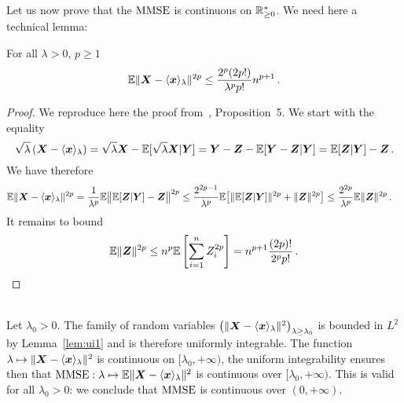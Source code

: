 \documentclass[12pt,nocut]{article}
\begin{document}
	Let us now prove that the ${{\rm MMSE}}$ is continuous on $\mathbb{R}_{\geq 0}^*$. We need here a technical lemma:
	\begin{lemma}\label{lem:ui1}
		For all $\lambda > 0$, $p \geq 1$
		$$
		\mathbb{E} \| {\boldsymbol X} - \langle {\boldsymbol x} \rangle_{\lambda} \|^{2p} \leq \frac{2^p (2p !)}{\lambda ^{p} p!} n^{p+1} \,.
		$$
	\end{lemma}
	\begin{proof}
		We reproduce here the proof from~\cite{guo2011estimation}, Proposition~5. We start with the equality
		$$
		\sqrt{\lambda} \left({\boldsymbol X} - \langle {\boldsymbol x} \rangle_{\lambda}\right)
		=
		\sqrt{\lambda} {\boldsymbol X} - \mathbb{E} [ \sqrt{\lambda} {\boldsymbol X} | {\boldsymbol Y} ]
		=
		{\boldsymbol Y} - {\boldsymbol Z} - \mathbb{E} [ {\boldsymbol Y} - {\boldsymbol Z} | {\boldsymbol Y} ]
		=
		\mathbb{E} [ {\boldsymbol Z} | {\boldsymbol Y} ] -{\boldsymbol Z} \,.
		$$
		We have therefore
		\begin{align*}
			\mathbb{E} \| {\boldsymbol X} - \langle {\boldsymbol x} \rangle_{\lambda} \|^{2p} 
			&= \frac{1}{\lambda ^{p}} 
			\mathbb{E} \big\| \mathbb{E} [ {\boldsymbol Z} | {\boldsymbol Y} ] -{\boldsymbol Z}\big\|^{2p}
			\leq 
			\frac{2^{2p-1}}{\lambda ^{p}} 
			\mathbb{E} \big[  \|\mathbb{E} [ {\boldsymbol Z} | {\boldsymbol Y} ]\|^{2p} +\|{\boldsymbol Z}\|^{2p} \big]
			\leq
			\frac{2^{2p}}{\lambda ^{p}} 
			\mathbb{E} \|{\boldsymbol Z}\|^{2p} \,.
		\end{align*}
		It remains to bound
		$$
		\mathbb{E} \|{\boldsymbol Z}\|^{2p}
		\leq n^p \mathbb{E} \left[\sum_{i=1}^n Z_i^{2p} \right]
		= n^{p+1} \frac{(2p)!}{2^p p!} \,.
		$$
	\end{proof}
	\\

	Let $\lambda_0 > 0$. The family of random variables $\big(\| {\boldsymbol X} - \langle {\boldsymbol x}\rangle_{\lambda}\|^2\big)_{\lambda \geq \lambda_0}$ is bounded in $L^2$ by Lemma~\ref{lem:ui1} and is therefore uniformly integrable. The function $\lambda \mapsto \| {\boldsymbol X} - \langle {\boldsymbol x}\rangle_{\lambda}\|^2$ is continuous on $[\lambda_0,+\infty)$, the uniform integrability ensures then that ${{\rm MMSE}}: \lambda \mapsto  \mathbb{E}\| {\boldsymbol X} - \langle {\boldsymbol x}\rangle_{\lambda}\|^2$ is continuous over $[\lambda_0,+\infty)$. This is valid for all $\lambda_0 >0$: we conclude that ${{\rm MMSE}}$ is continuous over $(0,+\infty)$.
\end{document}
